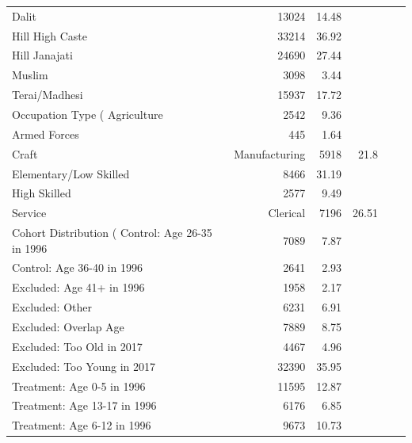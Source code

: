 \begin{table}[!h]
{\begin{tabular}[t]{lrrrrr}
Dalit & 13024 & 14.48 &  &  & \\
Hill High Caste & 33214 & 36.92 &  &  & \\
Hill Janajati & 24690 & 27.44 &  &  & \\
Muslim & 3098 & 3.44 &  &  & \\
\addlinespace
Terai/Madhesi & 15937 & 17.72 &  &  & \\
Occupation Type (%
Agriculture & 2542 & 9.36 &  &  & \\
Armed Forces & 445 & 1.64 &  &  & \\
Craft & Manufacturing & 5918 & 21.8 &  &  & \\
\addlinespace
Elementary/Low Skilled & 8466 & 31.19 &  &  & \\
High Skilled & 2577 & 9.49 &  &  & \\
Service & Clerical & 7196 & 26.51 &  &  & \\
Cohort Distribution (%
Control: Age 26-35 in 1996 & 7089 & 7.87 &  &  & \\
\addlinespace
Control: Age 36-40 in 1996 & 2641 & 2.93 &  &  & \\
Excluded: Age 41+ in 1996 & 1958 & 2.17 &  &  & \\
Excluded: Other & 6231 & 6.91 &  &  & \\
Excluded: Overlap Age & 7889 & 8.75 &  &  & \\
Excluded: Too Old in 2017 & 4467 & 4.96 &  &  & \\
\addlinespace
Excluded: Too Young in 2017 & 32390 & 35.95 &  &  & \\
Treatment: Age 0-5 in 1996 & 11595 & 12.87 &  &  & \\
Treatment: Age 13-17 in 1996 & 6176 & 6.85 &  &  & \\
Treatment: Age 6-12 in 1996 & 9673 & 10.73 &  &  & \\
\bottomrule
\end{tabular}}
\end{table}
